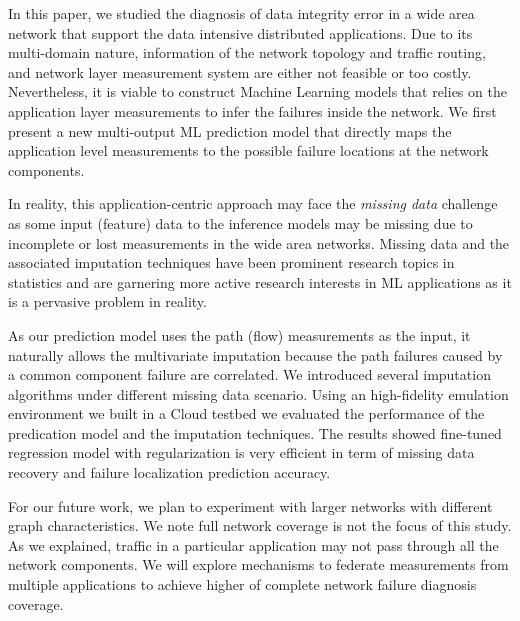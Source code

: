 In this paper, we studied the diagnosis of data integrity error in a wide area network that support the data intensive distributed applications. 
Due to its multi-domain nature, information of the network topology and traffic routing, and network layer measurement system 
are either not feasible or too costly. Nevertheless, it is viable to construct Machine Learning models that relies on the application layer 
measurements to infer the failures inside the network. We first present a new multi-output ML prediction model that directly maps 
the application level measurements to the possible failure locations at the network components.   

In reality, this application-centric approach may face the {\it missing data} challenge 
as some input (feature) data to the inference models may be missing due to incomplete or lost measurements in the wide area networks. 
Missing data and the associated imputation techniques have been prominent research topics in statistics and are garnering more 
active research interests in ML applications as it is a pervasive problem in reality.
 
As our prediction model uses the path (flow) measurements as the input, it naturally allows the multivariate imputation because the path failures 
caused by a common component failure are correlated. We introduced several imputation algorithms under different missing data scenario.
Using an high-fidelity emulation environment we built in a Cloud testbed we evaluated the performance of the predication model and 
the imputation techniques. The results showed fine-tuned regression model with regularization is very efficient in term of missing data recovery 
and failure localization prediction accuracy.   

For our future work, we plan to experiment with larger networks with different graph characteristics. We note full network coverage is not the focus of this study. 
As we explained, traffic in a particular application may not pass through all the network components. We will explore mechanisms to federate measurements from 
multiple applications to achieve higher of complete network failure diagnosis coverage. 

